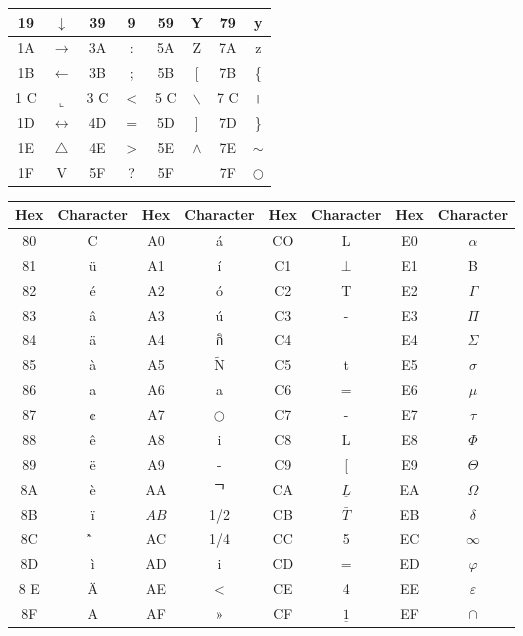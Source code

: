 \documentclass[10pt]{book}
\begin{document}
\begin{center}
\begin{tabular}{|c|c|c|c|c|c|c|c|}
\hline
19 & $\downarrow$ & 39 & 9 & 59 & Y & 79 & y \\
\hline
1A & $\rightarrow$ & 3A & : & 5A & Z & 7A & z \\
\hline
1B & $\leftarrow$ & 3B & ; & 5B & [ & 7B & \{ \\
\hline
1 C & $\llcorner$ & 3 C & < & 5 C & $\backslash$ & 7 C & । \\
\hline
1D & $\leftrightarrow$ & 4D & $=$ & 5D & ] & 7D & \} \\
\hline
1E & $\triangle$ & 4E & > & 5E & $\wedge$ & 7E & $\sim$ \\
\hline
1F & V & 5F & ? & 5F &  & 7F & $\bigcirc$ \\
\hline
\end{tabular}
\end{center}

\begin{center}
\begin{tabular}{|c|c|c|c|c|c|c|c|}
\hline
Hex & Character & Hex & Character & Hex & Character & Hex & Character \\
\hline
80 & C & A0 & á & CO & L & E0 & $\alpha$ \\
\hline
81 & ü & A1 & í & C1 & $\perp$ & E1 & B \\
\hline
82 & é & A2 & ó & C2 & T & E2 & $\Gamma$ \\
\hline
83 & â & A3 & ú & C3 & - & E3 & $\Pi$ \\
\hline
84 & ä & A4 & กิ & C4 &  & E4 & $\Sigma$ \\
\hline
85 & à & A5 & $\tilde{\mathrm{N}}$ & C5 & t & E5 & $\sigma$ \\
\hline
86 & a & A6 & a & C6 & $=$ & E6 & $\mu$ \\
\hline
87 & ¢ & A7 & $\bigcirc$ & C7 & - & E7 & $\tau$ \\
\hline
88 & ê & A8 & i & C8 & L & E8 & $\Phi$ \\
\hline
89 & ë & A9 & - & C9 & [ & E9 & $\Theta$ \\
\hline
8A & è & AA & ᄀ & CA & $\underline{L}$ & EA & $\Omega$ \\
\hline
8B & ï & $A B$ & 1/2 & CB & $\bar{T}$ & EB & $\delta$ \\
\hline
8C & ̂̀ & AC & 1/4 & CC & 5 & EC & $\infty$ \\
\hline
8D & ì & AD & i & CD & $=$ & ED & $\varphi$ \\
\hline
8 E & Ä & AE & < & CE & 4 & EE & $\varepsilon$ \\
\hline
8F & A & AF & » & CF & $\underline{1}$ & EF & $\cap$ \\

\end{tabular}
\end{center}
\end{document}
